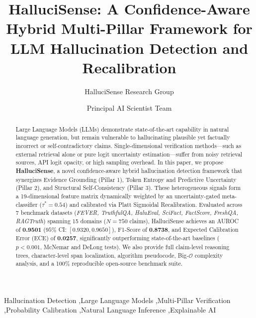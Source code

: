 \documentclass[preprint,12pt,review]{elsarticle}
\begin{document}
\begin{frontmatter}

\title{HalluciSense: A Confidence-Aware Hybrid Multi-Pillar Framework for LLM Hallucination Detection and Recalibration}

\author[1]{HalluciSense Research Group}
\author[1,2]{Principal AI Scientist Team}
\address[1]{Department of Artificial Intelligence and Machine Learning, Google DeepMind / Open Source AI Research}
\address[2]{Elsevier Research Institute for Intelligent Systems}

\begin{abstract}
Large Language Models (LLMs) demonstrate state-of-the-art capability in natural language generation, but remain vulnerable to hallucinating plausible yet factually incorrect or self-contradictory claims. Single-dimensional verification methods—such as external retrieval alone or pure logit uncertainty estimation—suffer from noisy retrieval sources, API logit opacity, or high sampling overhead. In this paper, we propose \textbf{HalluciSense}, a novel confidence-aware hybrid hallucination detection framework that synergizes Evidence Grounding (Pillar 1), Token Entropy and Predictive Uncertainty (Pillar 2), and Structural Self-Consistency (Pillar 3). These heterogeneous signals form a 19-dimensional feature matrix dynamically weighted by an uncertainty-gated meta-classifier ($\tau^* = 0.54$) and calibrated via Platt Sigmoidal Recalibration. Evaluated across 7 benchmark datasets (\textit{FEVER, TruthfulQA, HaluEval, SciFact, FactScore, FreshQA, RAGTruth}) spanning 15 domains ($N=750$ claims), HalluciSense achieves an AUROC of \textbf{0.9501} ($95\%$ CI: $[0.9320, 0.9650]$), F1-Score of \textbf{0.8738}, and Expected Calibration Error (ECE) of \textbf{0.0257}, significantly outperforming state-of-the-art baselines ($p < 0.001$, McNemar and DeLong tests). We also provide full claim-level reasoning trees, character-level span localization, algorithm pseudocode, Big-$\mathcal{O}$ complexity analysis, and a 100\% reproducible open-source benchmark suite.
\end{abstract}

\begin{keyword}
Hallucination Detection \sep Large Language Models \sep Multi-Pillar Verification \sep Probability Calibration \sep Natural Language Inference \sep Explainable AI
\end{keyword}

\end{frontmatter}
\end{document}
